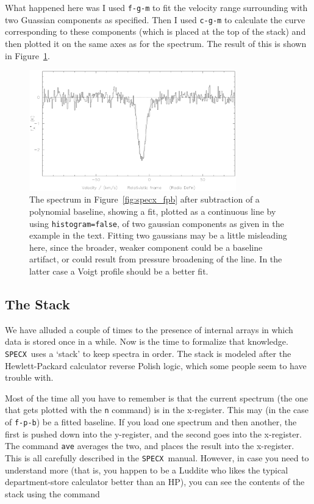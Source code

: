 \documentclass[11pt,twoside]{starlink}
\providecommand{\SPECX}{\texttt{SPECX}}
\begin{document}
What happened here was I used \texttt{f-g-m} to fit the velocity range
surrounding with two Guassian components as specified. Then I used
\texttt{c-g-m} to calculate the curve corresponding to these components
(which is placed at the top of the stack) and then plotted it on the
same axes as for the spectrum.  The result of this is shown in
Figure~\ref{fig:specx_fgm}.

\begin{figure}[htb]
\centering
\includegraphics[width=0.8\textwidth]{sc8_cgm}
\caption[A gaussian model fit]
{\small{The spectrum in Figure~\ref{fig:specx_fpb} after subtraction
of a polynomial baseline, showing a fit, plotted as a continuous line
by using \texttt{histogram=false}, of two gaussian components as given in
the example in the text. Fitting two gaussians may be a little
misleading here, since the broader, weaker component could be a
baseline artifact, or could result from pressure broadening of the
line. In the latter case a Voigt profile should be a better fit.  }}
\label{fig:specx_fgm}
\end{figure}

\subsection{The Stack}
\label{sec:specx_6}
We have alluded a couple of times to the presence of internal arrays
in which data is stored once in a while. Now is the time to formalize
that knowledge.
\SPECX\ uses a `stack' to keep spectra in order.  The stack is modeled after
the Hewlett-Packard calculator reverse Polish logic, which some people
seem to have trouble with.

Most of the time all you have to remember is that the current spectrum
(the one that gets plotted with the \texttt{n} command) is in the
x-register. This may (in the case of \texttt{f-p-b}) be a fitted
baseline. If you load one spectrum and then another, the first is
pushed down into the y-register, and the second goes into the
x-register. The command \texttt{ave} averages the two, and places the
result into the x-register. This is all carefully described in the
\SPECX\ manual. However, in case you need to understand more (that is,
you happen to be a Luddite who likes the typical department-store
calculator better than an HP), you can see the contents of the stack
using the command
\end{document}
